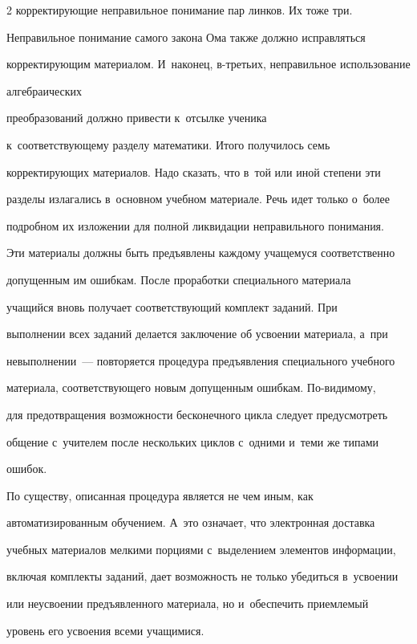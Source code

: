 \begin{multicols}{2}
корректирующие неправильное понимание пар линков. Их тоже три. 


Неправильное понимание самого закона Ома также должно исправляться 


корректирующим материалом. И~наконец, в-третьих, неправильное использование 


алгебраических %


преобразований должно привести к~отсылке ученика 


к~соответствующему разделу математики. Итого получилось семь 


корректирующих материалов. Надо сказать, что в~той или иной степени эти 


разделы излагались в~основном учебном материале. Речь идет только о~более 


подробном их изложении для полной ликвидации неправильного понимания. 


Эти материалы должны быть предъявлены каждому учащемуся соответственно 


до\-пущенным им ошибкам. После проработки специального материала 


учащийся вновь получает соответств\-ующий комплект заданий. При 


выполнении всех заданий делается заключение об усво\-ении материала, а~при 


невыполнении~--- повторяется процедура предъявления специального учебного 


материала, соответствующего новым допущенным ошибкам. По-ви\-ди\-мо\-му, 


для предотвращения возможности бесконечного цикла следует предусмотреть 


общение с~учителем после нескольких циклов с~одними и~теми же типами 


ошибок.


  


  По существу, описанная процедура является не чем иным, как 


автоматизированным обучением. А~это означает, что электронная доставка 


учебных материалов мелкими порциями с~выделением элементов информации, 


включая комплекты заданий, дает возможность не только убедиться в~усвоении 


или неусвоении предъявленного материала, но и~обеспечить приемлемый 


уровень его усвоения всеми учащимися.



\end{multicols}
